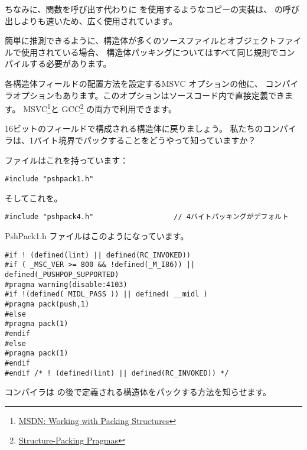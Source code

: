 ちなみに、関数を呼び出す代わりに \MOV を使用するようなコピーの実装は、
の呼び出しよりも速いため、広く使用されています。

簡単に推測できるように、構造体が多くのソースファイルとオブジェクトファイルで使用されている場合、
構造体パッキングについてはすべて同じ規則でコンパイルする必要があります。

\newcommand{\FNURLMSDNZP}{\footnote{\href{http://go.yurichev.com/17067}
{MSDN: Working with Packing Structures}}}
\newcommand{\FNURLGCCPC}{\footnote{\href{http://go.yurichev.com/17068}
{Structure-Packing Pragmas}}}

各構造体フィールドの配置方法を設定するMSVC オプションの他に、
コンパイラオプションもあります。このオプションはソースコード内で直接定義できます。 
MSVC\FNURLMSDNZP と GCC\FNURLGCCPC{} の両方で利用できます。

16ビットのフィールドで構成される構造体に戻りましょう。
私たちのコンパイラは、1バイト境界でパックすることをどうやって知っていますか？

ファイルはこれを持っています：

\begin{lstlisting}[caption=WinNT.h,style=customc]
#include "pshpack1.h"
\end{lstlisting}

そしてこれを。

\begin{lstlisting}[caption=WinNT.h,style=customc]
#include "pshpack4.h"                   // 4バイトパッキングがデフォルト
\end{lstlisting}

PshPack1.h ファイルはこのようになっています。

\begin{lstlisting}[caption=PshPack1.h,style=customc]
#if ! (defined(lint) || defined(RC_INVOKED))
#if ( _MSC_VER >= 800 && !defined(_M_I86)) || defined(_PUSHPOP_SUPPORTED)
#pragma warning(disable:4103)
#if !(defined( MIDL_PASS )) || defined( __midl )
#pragma pack(push,1)
#else
#pragma pack(1)
#endif
#else
#pragma pack(1)
#endif
#endif /* ! (defined(lint) || defined(RC_INVOKED)) */
\end{lstlisting}

コンパイラは  の後で定義される構造体をパックする方法を知らせます。


